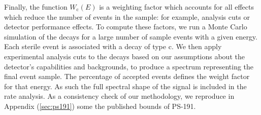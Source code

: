 \documentclass[11pt, a4paper]{article}
\newcommand{\reffig}[1]{Fig.~\ref{#1}}
\newcommand{\newtext}[2]{\textcolor{#1}{\ul{#2}}}
\begin{document}
%
Finally, the function $W_\text{c}(E)$ is a weighting factor which accounts for
all effects which reduce the number of events in the sample: for example,
analysis cuts or detector performance effects.
%
To compute these factors, we run a Monte Carlo simulation of the decays for a
large number of sample events with a given energy. Each sterile event is
associated with a decay of type $\text{c}$. We then apply experimental analysis
cuts to the decays based on our assumptions about the detector's capabilities
and backgrounds, to produce a spectrum representing the final event sample. The
percentage of accepted events defines the weight factor for that energy. As such the full spectral shape of the signal is included in the rate analysis. As a consistency check of our methodology, we reproduce in Appendix (\ref{sec:ps191}) some
the published bounds of PS-191. 

%
\end{document}

